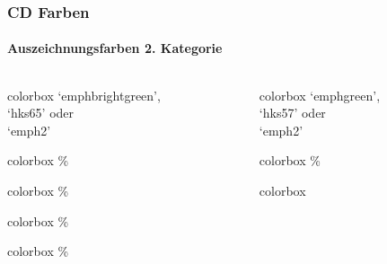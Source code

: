 \documentclass[german,notoc,draft]{tudbeamer}%
\begin{document}
\begin{frame}
	\frametitle{CD Farben}
	\framesubtitle{Auszeichnungsfarben 2. Kategorie}

	\begin{columns}[T,onlytextwidth]
		\begin{column}{.19\textwidth}%
			\begin{beamercolorbox}[wd=0.9\textwidth,sep=1em]{colorbox}
				\centering `emphbrightgreen',\\ `hks65' oder\\ `emph2'
		    \end{beamercolorbox}
			\begin{beamercolorbox}[wd=0.9\textwidth,sep=1em]{colorbox}
				\%
		    \end{beamercolorbox}
			\begin{beamercolorbox}[wd=0.9\textwidth,sep=1em]{colorbox}
				\%
		    \end{beamercolorbox}
			\begin{beamercolorbox}[wd=0.9\textwidth,sep=1em]{colorbox}
				\%
		    \end{beamercolorbox}
			\begin{beamercolorbox}[wd=0.9\textwidth,sep=1em]{colorbox}
				\%
		    \end{beamercolorbox}
		\end{column}
		\begin{column}{.19\textwidth}%
			\begin{beamercolorbox}[wd=0.9\textwidth,sep=1em]{colorbox}
				\centering `emphgreen',\\ `hks57' oder\\ `emph2'
		    \end{beamercolorbox}
			\begin{beamercolorbox}[wd=0.9\textwidth,sep=1em]{colorbox}
				\%
		    \end{beamercolorbox}
			\begin{beamercolorbox}[wd=0.9\textwidth,sep=1em]{colorbox}

\end{beamercolorbox}
\end{column}
\end{columns}
\end{frame}
\end{document}
